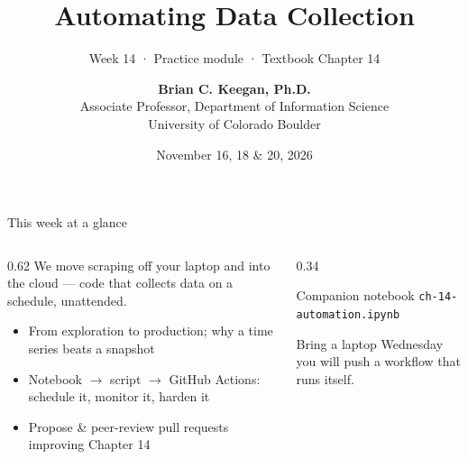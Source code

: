 \documentclass[9pt,aspectratio=169]{beamer}
\title[Week 14 · Automation]{{\Huge Automating Data Collection}}
\subtitle{Week 14 · Practice module · Textbook Chapter 14}
\author[Keegan]{\textbf{Brian C. Keegan, Ph.D.} \\ Associate Professor, Department of Information Science \\ University of Colorado Boulder}
\date{November 16, 18 \& 20, 2026}
\begin{document}
\maketitle

\begin{frame}{This week at a glance}
    \begin{columns}[T]
        \begin{column}{0.62\textwidth}
            We move scraping off your laptop and into the cloud --- code that collects data on a schedule, unattended.

            \vspace{1em}

            \begin{itemize}\small
                \item From exploration to production; why a time series beats a snapshot
            \end{itemize}

            \vspace{0.5em}

            \begin{itemize}\small
                \item Notebook $\rightarrow$ script $\rightarrow$ GitHub Actions: schedule it, monitor it, harden it
            \end{itemize}

            \vspace{0.5em}

            \begin{itemize}\small
                \item Propose \& peer-review pull requests improving Chapter 14
            \end{itemize}
        \end{column}
        \begin{column}{0.34\textwidth}
            \begin{block}{Companion notebook}
                \footnotesize \texttt{ch-14-automation.ipynb}
            \end{block}
            \begin{alertblock}{Bring a laptop}
                \footnotesize Wednesday you will push a workflow that runs itself.
            \end{alertblock}
        \end{column}
    \end{columns}
\end{frame}
\end{document}
